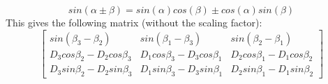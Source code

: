\documentclass[a4paper]{paper}
\begin{document}
\begin{equation}
    sin(\alpha \pm \beta) = sin(\alpha)cos(\beta)
    \pm cos(\alpha)sin(\beta)
\end{equation}
This gives the following matrix (without the scaling factor):
\begin{equation}
    \begin{bmatrix}
        sin(\beta_3 - \beta_2)
            & sin(\beta_1 - \beta_3)
            & sin(\beta_2 - \beta_1) \\
        D_3 cos \beta_2-D_2 cos \beta_3
            & D_1 cos \beta_3-D_3 cos \beta_1
            & D_2 cos \beta_1-D_1 cos \beta_2\\
        D_3 sin \beta_2-D_2 sin \beta_3
            & D_1 sin \beta_3-D_3 sin \beta_1
            & D_2 sin \beta_1-D_1 sin \beta_2
    \end{bmatrix}
\end{equation}
\end{document}
